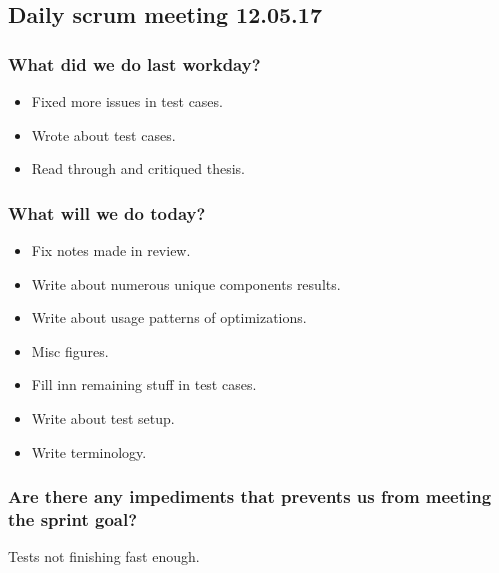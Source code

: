 \documentclass{article}
\begin{document}
\begin{center}
\subsection*{Daily scrum meeting 12.05.17}
\end{center}
\bigskip


\subsubsection*{What did we do last workday?}
\begin{itemize}
	\item
	Fixed more issues in test cases.

	\item
	Wrote about test cases.

	\item
	Read through and critiqued thesis.
\end{itemize}

\subsubsection*{What will we do today?}
\begin{itemize}
	\item
	Fix notes made in review.

	\item
	Write about numerous unique components results.

	\item
	Write about usage patterns of optimizations.

    \item
    Misc figures.

    \item
    Fill inn remaining stuff in test cases.

    \item
    Write about test setup.

    \item
    Write terminology.
\end{itemize}

\subsubsection*{Are there any impediments that prevents us from meeting the sprint goal?}
Tests not finishing fast enough.
\end{document}
